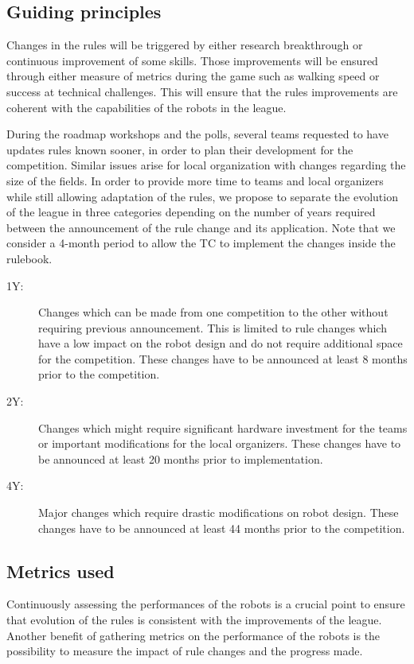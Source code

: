 \documentclass{article}
\begin{document}
\subsection{\label{sec:event-triggered-principles}Guiding principles}

Changes in the rules will be triggered by either research breakthrough or
continuous improvement of some skills. Those improvements will be ensured
through either measure of metrics during the game such as walking speed or
success at technical challenges. This will ensure that the rules improvements
are coherent with the capabilities of the robots in the league.

During the roadmap workshops and the polls, several teams requested to have
updates rules known sooner, in order to plan their development for the
competition. Similar issues arise for local organization with changes regarding
the size of the fields. In order to provide more time to teams and local
organizers while still allowing adaptation of the rules, we propose to separate
the evolution of the league in three categories depending on the number of years
required between the announcement of the rule change and its application. Note that
we consider a 4-month period to allow the TC to implement the changes inside the
rulebook.
\begin{description}
\item[1Y:] Changes which can be made from one competition to the other without
  requiring previous announcement. This is limited to rule changes which have a
  low impact on the robot design and do not require additional space for the
  competition. These changes have to be announced at least 8 months prior
  to the competition.
\item[2Y:] Changes which might require significant hardware investment for the
  teams or important modifications for the local organizers. These changes have
  to be announced at least 20 months prior to implementation.
\item[4Y:] Major changes which require drastic modifications on robot design.
  These changes have to be announced at least 44 months prior to the
  competition.
\end{description}

\subsection{\label{sec:metrics}Metrics used}
Continuously assessing the performances of the robots is a crucial point to
ensure that evolution of the rules is consistent with the improvements of the league.
Another benefit of gathering metrics on the performance of the robots is the possibility to
measure the impact of rule changes and the progress made.
\end{document}
